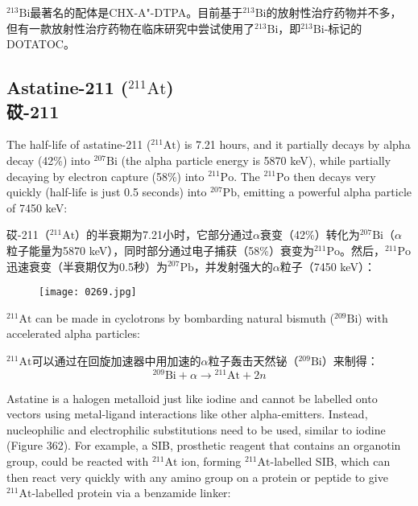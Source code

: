 \documentclass[dvipsnames, svgnames,a4paper,11pt]{article}
\begin{document}
\(\mathrm{^{213}Bi}\)最著名的配体是CHX-A"-DTPA。目前基于\(\mathrm{^{213}Bi}\)的放射性治疗药物并不多，但有一款放射性治疗药物在临床研究中尝试使用了\(\mathrm{^{213}Bi}\)，即\(\mathrm{^{213}Bi}\)-标记的DOTATOC。

\subsection{Astatine-211 (\(\mathrm{^{211}At}\)) \\砹-211}  
The half-life of astatine-211 (\(\mathrm{^{211}At}\)) is 7.21 hours, and it partially decays by alpha decay (42\%) into \(\mathrm{^{207}Bi}\) (the alpha particle energy is 5870 keV), while partially decaying by electron capture (58\%) into \(\mathrm{^{211}Po}\). The \(\mathrm{^{211}Po}\) then decays very quickly (half-life is just 0.5 seconds) into \(\mathrm{^{207}Pb}\), emitting a powerful alpha particle of 7450 keV:

砹-211（\(\mathrm{^{211}At}\)）的半衰期为7.21小时，它部分通过$\alpha$衰变（42\%）转化为\(\mathrm{^{207}Bi}\)（$\alpha$粒子能量为5870 keV），同时部分通过电子捕获（58\%）衰变为\(\mathrm{^{211}Po}\)。然后，\(\mathrm{^{211}Po}\)迅速衰变（半衰期仅为0.5秒）为\(\mathrm{^{207}Pb}\)，并发射强大的$\alpha$粒子（7450 keV）：

\begin{figure}[h]
	\centering
    \texttt{[image: 0269.jpg]}  
     \label{fig361}
\end{figure}

\(\mathrm{^{211}At}\) can be made in cyclotrons by bombarding natural bismuth (\(\mathrm{^{209}Bi}\)) with accelerated alpha particles:

\(\mathrm{^{211}At}\)可以通过在回旋加速器中用加速的$\alpha$粒子轰击天然铋（\(\mathrm{^{209}Bi}\)）来制得：
\[
\mathrm{^{209}Bi} + \alpha \rightarrow \mathrm{^{211}At} + 2n
\]

Astatine is a halogen metalloid just like iodine and cannot be labelled onto vectors using metal-ligand interactions like other alpha-emitters. Instead, nucleophilic and electrophilic substitutions need to be used, similar to iodine (Figure 362). For example, a SIB, prosthetic reagent that contains an organotin group, could be reacted with \(\mathrm{^{211}At}\) ion, forming \(\mathrm{^{211}At}\)-labelled SIB, which can then react very quickly with any amino group on a protein or peptide to give \(\mathrm{^{211}At}\)-labelled protein via a benzamide linker:
\end{document}

